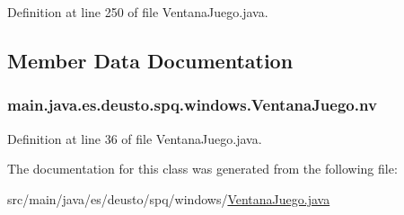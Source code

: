 Definition at line 250 of file Ventana\+Juego.\+java.



\subsection{Member Data Documentation}
\subsubsection[{\texorpdfstring{nv}{nv}}]{ main.\+java.\+es.\+deusto.\+spq.\+windows.\+Ventana\+Juego.\+nv\hspace{0.3cm}{\ttfamily [static]}}\hypertarget{classmain_1_1java_1_1es_1_1deusto_1_1spq_1_1windows_1_1_ventana_juego_a3e59bf8641104a1a8224d7def9866ead}{}\label{classmain_1_1java_1_1es_1_1deusto_1_1spq_1_1windows_1_1_ventana_juego_a3e59bf8641104a1a8224d7def9866ead}


Definition at line 36 of file Ventana\+Juego.\+java.



The documentation for this class was generated from the following file\+:\begin{DoxyCompactItemize}
\item 
src/main/java/es/deusto/spq/windows/\hyperlink{_ventana_juego_8java}{Ventana\+Juego.\+java}\end{DoxyCompactItemize}
